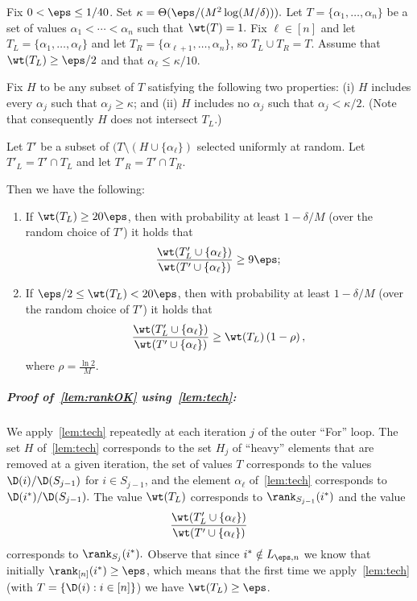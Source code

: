 \begin{lemma} \label{lem:tech}
Fix $0 < \eps \leq 1/40$. Set 
$\kappa = \Theta(\eps/(M^2 \log(M/\delta))).$
Let $T=\{\alpha_1,\dots,\alpha_n\}$ be a set of values $\alpha_1 < \cdots < \alpha_n$ such that
$\wt(T)=1.$
Fix $\ell \in [n]$ and let
$T_L = \{\alpha_1,\dots,\alpha_\ell\}$ and let
$T_R = \{\alpha_{\ell+1},\dots,\alpha_n\}$, so $T_L \cup T_R = T.$
Assume that $\wt(T_L) \geq \eps/2$
and that $\alpha_\ell \leq \kappa/10.$

Fix $H$ to be any subset of $T$ satisfying the following two properties:
(i) $H$ includes every $\alpha_j$ such that $\alpha_j \geq \kappa$; and
(ii) $H$ includes no $\alpha_j$ such that $\alpha_j < \kappa/2.$
(Note that consequently $H$ does not intersect $T_L.$)


Let $T'$ be a subset of $(T \setminus (H \cup \{\alpha_\ell\})$
selected uniformly at random.
Let $T'_L = T' \cap T_L$ and let $T'_R = T' \cap T_R$.

Then we have the following:

\begin{enumerate}

\item If $\wt(T_L) \geq 20 \eps$,  then with probability at least
$1 - \delta{/M}$
(over the random choice of $T'$) it holds that
\[
\frac {\wt(T'_L \cup \{\alpha_\ell\})}{\wt(T' \cup \{\alpha_\ell\})} \geq 9 \eps;
\]

\item If $\eps/2 \leq \wt(T_L) < 20 \eps$, then with probability at
least $1 - \delta{/M}$ (over the random choice of $T'$) it holds that
\[
\frac {\wt(T'_L \cup \{\alpha_\ell\})}{\wt(T' \cup \{\alpha_\ell\})} \geq
\wt(T_L) \left( 1 - \rho \right),
\]
where $\rho = {\frac {\ln 2}{M}}.$
\end{enumerate}
\end{lemma}

\subparagraph{Proof of~\cref{lem:rankOK} using~\cref{lem:tech}:}
We apply~\cref{lem:tech} repeatedly at each iteration $j$ of the
outer ``For'' loop.
The set $H$ of~\cref{lem:tech}
corresponds to the set $H_{j}$ of ``heavy''
elements that are removed at a given iteration, the set of values
$T$ corresponds to the values $\D(i)/\D(S_{j-1})$ for $i \in S_{j-1}$,
and the element $\alpha_\ell$ of~\cref{lem:tech} corresponds
to $\D(i^\ast)/\D(S_{j-1}).$  The value $\wt(T_L)$ corresponds
to $\rank_{S_{j-1}}(i^\ast)$
and the value
\[
{\frac {\wt(T'_L \cup \{\alpha_\ell\})}
       {\wt(T' \cup \{\alpha_\ell\})}}
\]
corresponds to $\rank_{S_j}(i^\ast).$
Observe that since $i^\ast \notin L_{\eps,n}$ we know that
initially $\rank_{[n]}(i^\ast) \geq \eps$,
which means that the first time we apply~\cref{lem:tech}
(with $T=\{\D(i): i \in [n]\}$) we have $\wt(T_L) \geq \eps$.

